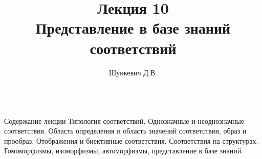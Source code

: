 \title{Лекция 10\\Представление в базе знаний соответствий}
\author[]{Шункевич Д.В.}

\begin{frame}
	\titlepage
\end{frame}

\begin{frame}{\\Содержание лекции}
	\topline
	\justifying
	Типология соответствий. Однозначные и неоднозначные соответствия. Область определения и область значений соответствия, образ и прообраз. Отображения и биективные соответствия. Соответствия на структурах. Гомоморфизмы, изоморфизмы, автоморфизмы, представление в базе знаний.
\end{frame}